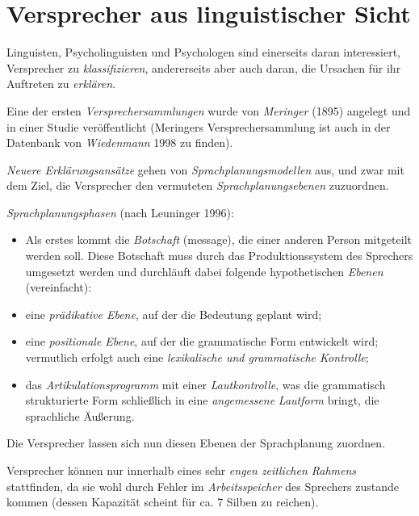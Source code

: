 \documentclass[
  letterpaper,
]{scrbook}
\providecommand{\tightlist}{%
  \setlength{\itemsep}{0pt}\setlength{\parskip}{0pt}}\usepackage{longtable,booktabs,array}
\begin{document}
\hypertarget{versprecher-aus-linguistischer-sicht}{%
\section{Versprecher aus linguistischer
Sicht}\label{versprecher-aus-linguistischer-sicht}}

Linguisten, Psycholinguisten und Psychologen sind einerseits daran
interessiert, Versprecher zu \emph{klassifizieren}, andererseits aber
auch daran, die Ursachen für ihr Auftreten zu \emph{erklären}.

Eine der ersten \emph{Versprechersammlungen} wurde von \emph{Meringer}
(1895) angelegt und in einer Studie veröffentlicht (Meringers
Versprechersammlung ist auch in der Datenbank von \emph{Wiedenmann} 1998
zu finden).

\emph{Neuere Erklärungsansätze} gehen von \emph{Sprachplanungsmodellen}
aus, und zwar mit dem Ziel, die Versprecher den vermuteten
\emph{Sprachplanungsebenen} zuzuordnen.

\emph{Sprachplanungsphasen} (nach Leuninger 1996):

\begin{itemize}
\tightlist
\item
  Als erstes kommt die \emph{Botschaft} (message), die einer anderen
  Person mitgeteilt werden soll. Diese Botschaft muss durch das
  Produktionssystem des Sprechers umgesetzt werden und durchläuft dabei
  folgende hypothetischen \emph{Ebenen} (vereinfacht):\\
\item
  eine \emph{prädikative Ebene}, auf der die Bedeutung geplant wird;\\
\item
  eine \emph{positionale Ebene}, auf der die grammatische Form
  entwickelt wird; vermutlich erfolgt auch eine \emph{lexikalische und
  grammatische Kontrolle};\\
\item
  das \emph{Artikulationsprogramm} mit einer \emph{Lautkontrolle}, was
  die grammatisch strukturierte Form schließlich in eine
  \emph{angemessene} \emph{Lautform} bringt, die sprachliche Äußerung.
\end{itemize}

Die Versprecher lassen sich nun diesen Ebenen der Sprachplanung
zuordnen.

Versprecher können nur innerhalb eines sehr \emph{engen zeitlichen
Rahmens} stattfinden, da sie wohl durch Fehler im \emph{Arbeitsspeicher}
des Sprechers zustande kommen (dessen Kapazität scheint für ca. 7 Silben
zu reichen).
\end{document}
